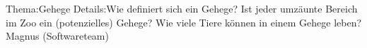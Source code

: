 
%
	{Thema:}{Gehege}%
	{Details:}{Wie definiert sich ein Gehege? Ist jeder umzäunte Bereich im Zoo ein (potenzielles) Gehege? Wie viele Tiere können in einem Gehege leben?}%
	{Magnus (Softwareteam)}
